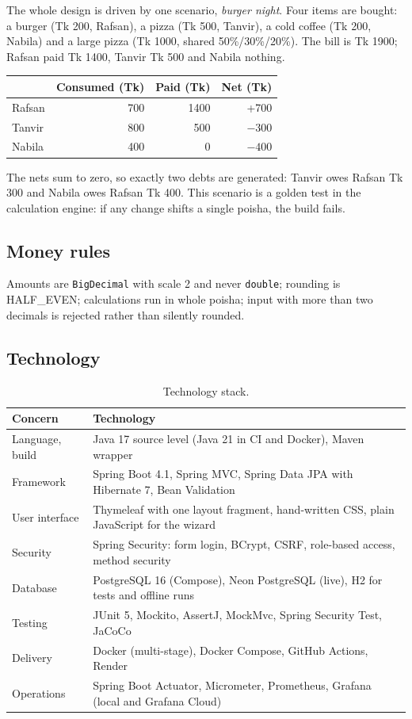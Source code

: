 \documentclass[10pt,a4paper]{article}
\newcommand{\code}[1]{\texttt{#1}}
\begin{document}
The whole design is driven by one scenario, \emph{burger night}. Four items are bought: a burger (Tk 200, Rafsan), a
pizza (Tk 500, Tanvir), a cold coffee (Tk 200, Nabila) and a large pizza (Tk 1000, shared 50\%/30\%/20\%). The bill is
Tk 1900; Rafsan paid Tk 1400, Tanvir Tk 500 and Nabila nothing.

\begin{center}
\small
\begin{tabular}{lrrr}
\toprule
 & Consumed (Tk) & Paid (Tk) & Net (Tk) \\
\midrule
Rafsan & 700 & 1400 & +700 \\
Tanvir & 800 & 500 & $-300$ \\
Nabila & 400 & 0 & $-400$ \\
\bottomrule
\end{tabular}
\end{center}

The nets sum to zero, so exactly two debts are generated: Tanvir owes Rafsan Tk 300 and Nabila owes Rafsan Tk 400.
This scenario is a golden test in the calculation engine: if any change shifts a single poisha, the build fails.

\subsection{Money rules}

Amounts are \code{BigDecimal} with scale 2 and never \code{double}; rounding is HALF\_EVEN; calculations run in whole
poisha; input with more than two decimals is rejected rather than silently rounded.

\subsection{Technology}

\begin{table}[H]
\centering\small
\caption{Technology stack.}
\begin{tabularx}{\textwidth}{@{}lY@{}}
\toprule
Concern & Technology \\
\midrule
Language, build & Java 17 source level (Java 21 in CI and Docker), Maven wrapper \\
Framework & Spring Boot 4.1, Spring MVC, Spring Data JPA with Hibernate 7, Bean Validation \\
User interface & Thymeleaf with one layout fragment, hand-written CSS, plain JavaScript for the wizard \\
Security & Spring Security: form login, BCrypt, CSRF, role-based access, method security \\
Database & PostgreSQL 16 (Compose), Neon PostgreSQL (live), H2 for tests and offline runs \\
Testing & JUnit 5, Mockito, AssertJ, MockMvc, Spring Security Test, JaCoCo \\
Delivery & Docker (multi-stage), Docker Compose, GitHub Actions, Render \\
Operations & Spring Boot Actuator, Micrometer, Prometheus, Grafana (local and Grafana Cloud) \\
\bottomrule
\end{tabularx}
\end{table}
\end{document}
